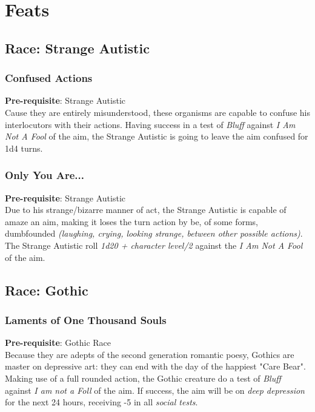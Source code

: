 \documentclass[ letterpaper,12pt]{article}
\begin{document}
\section{Feats}

\subsection{Race: Strange Autistic}

\subsubsection{Confused Actions}
{\bf Pre-requisite}: Strange Autistic\\
Cause they are entirely misunderstood, these organisms are capable to confuse his interlocutors with their actions. Having success in a test of {\it Bluff} against {\it I Am Not A Fool} of the aim, the Strange Autistic is going to leave the aim confused for 1d4 turns.

\subsubsection{Only You Are...}
 {\bf Pre-requisite}: Strange Autistic\\
Due to his strange/bizarre manner of act, the Strange Autistic is capable of amaze an aim, making it loses the turn action by be, of some forms, dumbfounded {\it (laughing, crying, looking strange, between other possible actions)}.  The Strange Autistic roll {\it 1d20 + character level/2} against the {\it I Am Not A Fool} of the aim.

\subsection{Race: Gothic}

\subsubsection{Laments of One Thousand Souls}
{\bf Pre-requisite}: Gothic Race\\
Because they are adepts of the second generation romantic poesy, Gothics are master on depressive art: they can end with the day of the happiest "Care Bear". Making use of a full rounded action, the Gothic creature do a test of {\it Bluff} against {\it I am not a Foll} of the aim. If success, the aim will be on {\it deep depression} for the next 24 hours, receiving -5 in all {\it social tests}.
\end{document}
